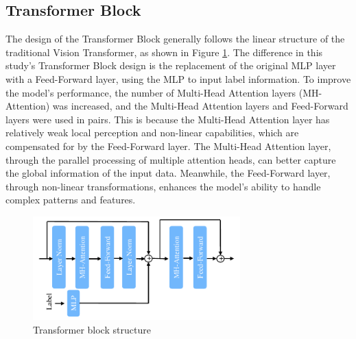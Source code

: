 \documentclass{acsman}
\begin{document}
\subsection{Transformer Block}
The design of the Transformer Block generally follows the linear structure of the traditional Vision Transformer, as shown in Figure \ref{fig:Transformer_Block}. The difference in this study's Transformer Block design is the replacement of the original MLP layer with a Feed-Forward layer, using the MLP to input label information. To improve the model's performance, the number of Multi-Head Attention layers (MH-Attention) was increased, and the Multi-Head Attention layers and Feed-Forward layers were used in pairs. This is because the Multi-Head Attention layer has relatively weak local perception and non-linear capabilities, which are compensated for by the Feed-Forward layer. The Multi-Head Attention layer, through the parallel processing of multiple attention heads, can better capture the global information of the input data. Meanwhile, the Feed-Forward layer, through non-linear transformations, enhances the model's ability to handle complex patterns and features.

\begin{figure}[H]
    \centering
    \includegraphics[width=8cm]{image/Transformer_Block_sum.pdf}
    \caption{Transformer block structure}
    \label{fig:Transformer_Block}
\end{figure}
\end{document}
